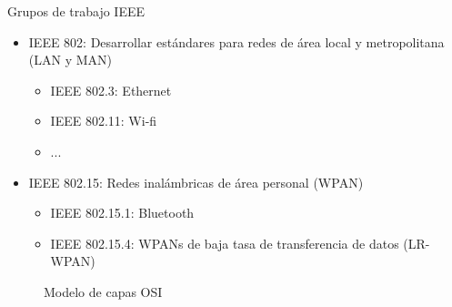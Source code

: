 \documentclass[aspectratio=169]{beamer}
\begin{document}
\begin{frame}{Grupos de trabajo IEEE} 

\begin{minipage}[c]{1.0\linewidth}
	\begin{minipage}[c]{0.6\linewidth}
		\begin{itemize}
			\item IEEE 802: Desarrollar estándares para redes de área local y metropolitana (LAN y MAN)
			\begin{itemize}
				\item IEEE 802.3: Ethernet
				\item IEEE 802.11: Wi-fi
				\item ...
			\end{itemize}
			\vspace{10px}
			\item IEEE 802.15: Redes inalámbricas de área personal (WPAN)
			\vspace{5px}
			\begin{itemize}
				\item IEEE 802.15.1: Bluetooth
				\item IEEE 802.15.4: WPANs de baja tasa de transferencia de datos (LR-WPAN)
			\end{itemize}
		\end{itemize}
	\end{minipage}
	\begin{minipage}[c]{0.35\linewidth}
		\begin{figure}[H]
			\label{OSI_model}
			\caption{Modelo de capas OSI}
		\end{figure}	  	  	
	\end{minipage}
\end{minipage}
	

\end{frame}
\end{document}
